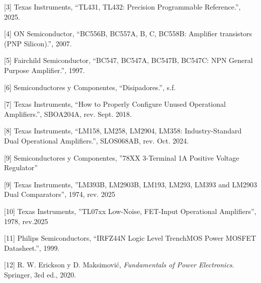 \documentclass[a4paper,12pt]{article}
\begin{document}
[3] Texas Instruments, ``TL431, TL432: Precision Programmable Reference.'', 2025.

[4] ON Semiconductor, ``BC556B, BC557A, B, C, BC558B: Amplifier transistors (PNP Silicon).'', 2007.

[5] Fairchild Semiconductor, ``BC547, BC547A, BC547B, BC547C: NPN General Purpose Amplifier.'', 1997.

[6] Semiconductores y Componentes, ``Disipadores.'', s.f.

[7] Texas Instruments, ``How to Properly Configure Unused Operational Amplifiers.'', SBOA204A, rev. Sept. 2018.

[8] Texas Instruments, ``LM158, LM258, LM2904, LM358: Industry-Standard Dual Operational Amplifiers.'', SLOS068AB, rev. Oct. 2024.

[9] Semiconductores y Componentes, ''78XX 3-Terminal 1A Positive Voltage Regulator''

[9] Texas Instruments, ''LM393B, LM2903B, LM193, LM293, LM393 and LM2903 Dual Comparators'', 1974, rev. 2025

[10] Texas Instruments, ''TL07xx Low-Noise, FET-Input Operational Amplifiers'', 1978, rev.2025

[11] Philips Semiconductors, ``IRFZ44N Logic Level TrenchMOS Power MOSFET Datasheet.'', 1999.

[12] R. W. Erickson y D. Maksimović, \textit{Fundamentals of Power Electronics}. Springer, 3rd ed., 2020.
\end{document}
